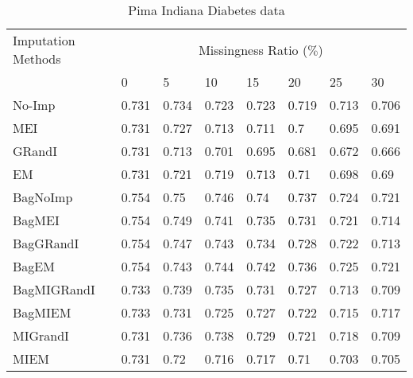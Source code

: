 \documentclass{iosart2c}
\begin{document}
\begin{table*}[htb]
\centering
\caption{Pima Indiana Diabetes data}
\label{tab:pima}
    \begin{tabular}{|p{25mm}|l|l|l|l|l|l|l|} \hline
     Imputation Methods    & \multicolumn{7}{c|}{Missingness Ratio ($\%$)} \\ \cline{2-8}
                           &  0 & 5 & 10 & 15 & 20 & 25 & 30 \\ \hline
No-Imp & 0.731 & 0.734 & 0.723 & 0.723 & 0.719 & 0.713 & 0.706 \\ \hline
MEI & 0.731 & 0.727 & 0.713 & 0.711 & 0.7 & 0.695 & 0.691 \\ \hline
GRandI & 0.731 & 0.713 & 0.701 & 0.695 & 0.681 & 0.672 & 0.666 \\ \hline
EM & 0.731 & 0.721 & 0.719 & 0.713 & 0.71 & 0.698 & 0.69 \\ \hline \hline
BagNoImp & 0.754 & 0.75 & 0.746 & 0.74 & 0.737 & 0.724 & 0.721 \\ \hline
BagMEI & 0.754 & 0.749 & 0.741 & 0.735 & 0.731 & 0.721 & 0.714 \\ \hline
BagGRandI & 0.754 & 0.747 & 0.743 & 0.734 & 0.728 & 0.722 & 0.713 \\ \hline
BagEM & 0.754 & 0.743 & 0.744 & 0.742 & 0.736 & 0.725 & 0.721 \\ \hline \hline
BagMIGRandI & 0.733 & 0.739 & 0.735 & 0.731 & 0.727 & 0.713 & 0.709 \\ \hline
BagMIEM & 0.733 & 0.731 & 0.725 & 0.727 & 0.722 & 0.715 & 0.717 \\ \hline \hline
MIGrandI & 0.731 & 0.736 & 0.738 & 0.729 & 0.721 & 0.718 & 0.709 \\ \hline
MIEM & 0.731 & 0.72 & 0.716 & 0.717 & 0.71 & 0.703 & 0.705 \\ \hline
\end{tabular}
\end{table*}
\end{document}
